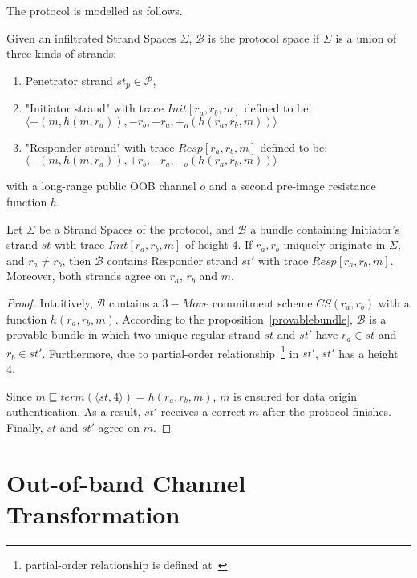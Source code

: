 The protocol is modelled as follows. 

\begin{Definition}
Given an infiltrated Strand Spaces $\Sigma$, $\mathcal{B}$ is the protocol space if $\Sigma$ is a union of three kinds of strands:
\begin{enumerate}
\item Penetrator strand $st_p \in \mathcal{P}$,
\item "Initiator strand" with trace {\small $Init[r_a,r_b,m]$} defined to be: \\ 
 {\small $\langle +(m,h(m,r_a)),-r_b,+r_a,+_o(h(r_a,r_b,m)) \rangle $}
\item "Responder strand" with trace {\small $Resp[r_a,r_b,m]$} defined to be: \\ 
 {\small $\langle -(m,h(m,r_a)),+r_b,-r_a,-_o(h(r_a,r_b,m)) \rangle$}
\end{enumerate}
with a long-range public OOB channel $o$ and a second pre-image resistance function $h$. 
\end{Definition}

\begin{Proposition}
Let $\Sigma$ be a Strand Spaces of the protocol, and $\mathcal{B}$ a bundle containing Initiator's strand $st$ with trace $Init[r_a,r_b,m]$ of height 4. If $r_a,r_b$ uniquely originate in $\Sigma$, and $r_a \not= r_b$, then $\mathcal{B}$ contains Responder strand $st'$ with trace $Resp[r_a,r_b,m]$. Moreover, both strands agree on $r_a$, $r_b$ and $m$.
\end{Proposition}

\begin{proof}
Intuitively, $\mathcal{B}$ contains a $3-Move$ commitment scheme $CS(r_a,r_b)$ with a function $h(r_a,r_b,m)$. According to the proposition~\ref{provablebundle}, $\mathcal{B}$ is a provable bundle in which two unique regular strand $st$ and $st'$ have $r_a \in st$ and $r_b \in st'$. Furthermore, due to partial-order relationship~\footnote{partial-order relationship is defined at~\cite{674832}} in $st'$, $st'$ has a height 4. 

Since $m \sqsubseteq term( \langle st,4 \rangle) = h(r_a,r_b,m)$, $m$ is ensured for data origin authentication. As a result, $st'$ receives a correct $m$ after the protocol finishes. Finally, $st$ and $st'$ agree on $m$.
\end{proof}

\section{Out-of-band Channel Transformation}


